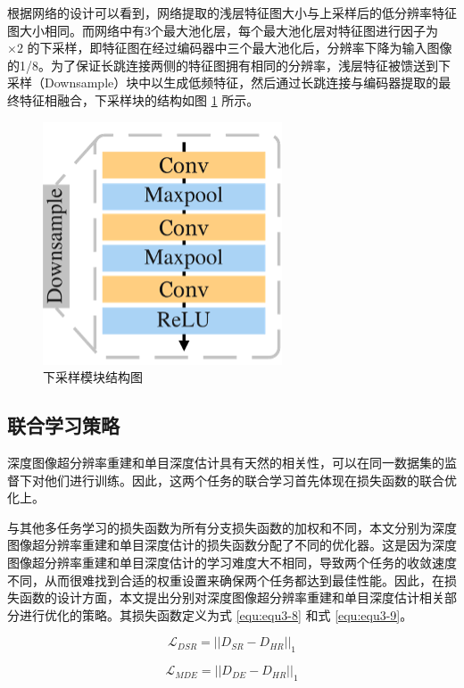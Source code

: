 根据网络的设计可以看到，网络提取的浅层特征图大小与上采样后的低分辨率特征图大小相同。而网络中有3个最大池化层，每个最大池化层对特征图进行因子为 $\times 2$ 的下采样，即特征图在经过编码器中三个最大池化后，分辨率下降为输入图像的1/8。为了保证长跳连接两侧的特征图拥有相同的分辨率，浅层特征被馈送到下采样（Downsample）块中以生成低频特征，然后通过长跳连接与编码器提取的最终特征相融合，下采样块的结构如图 \ref{fig:fig3-4} 所示。

\begin{figure}[!htbp]
	\centering
	\includegraphics[scale=0.95]{figures/20.png}
	\caption{下采样模块结构图}
	\label{fig:fig3-4}
\end{figure}

\subsection{联合学习策略}
深度图像超分辨率重建和单目深度估计具有天然的相关性，可以在同一数据集的监督下对他们进行训练。因此，这两个任务的联合学习首先体现在损失函数的联合优化上。

与其他多任务学习的损失函数为所有分支损失函数的加权和不同，本文分别为深度图像超分辨率重建和单目深度估计的损失函数分配了不同的优化器。这是因为深度图像超分辨率重建和单目深度估计的学习难度大不相同，导致两个任务的收敛速度不同，从而很难找到合适的权重设置来确保两个任务都达到最佳性能。因此，在损失函数的设计方面，本文提出分别对深度图像超分辨率重建和单目深度估计相关部分进行优化的策略。其损失函数定义为式 \ref{equ:equ3-8} 和式 \ref{equ:equ3-9}。

\begin{equation}
	\mathcal{L}_{DSR}=||D_{SR}-D_{HR}||_1
	\label{equ:equ3-8}
\end{equation}

\begin{equation}
	\mathcal{L}_{MDE}=||D_{DE}-D_{HR}||_1
	\label{equ:equ3-9}
\end{equation}

